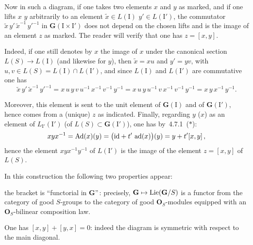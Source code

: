 Now in such a diagram, if one takes two elements \(x\) and \(y\) as marked, and if one
lifts \(x\) \resp \(y\) arbitrarily to an element \(\widetilde{x}\in L(\mathrm{I})\)
\resp \(y'\in L(\mathrm{I}')\), the commutator
\(\widetilde{x}\,y'\,\widetilde{x}^{-1}\,{y'}^{-1}\) in
\(\mathbf{G}(\mathrm{I}\times\mathrm{I}')\) does not depend on the chosen lifts and is
the image of an element \(z\) as marked. The reader will verify that one has
\(z=[x,y]\).%
{\renewcommand{\thefootnote}{(79)}}

Indeed, if one still denotes by \(x\) the image of \(x\) under the canonical section
\(L(S)\to L(\mathrm{I})\) (and likewise for \(y\)), then \(\widetilde{x}=xu\) and
\(y'=yv\), with \(u,v\in L(S)=L(\mathrm{I})\cap L(\mathrm{I}')\), and since
\(L(\mathrm{I})\) and \(L(\mathrm{I}')\) are commutative one has
\[
\widetilde{x}\,{y'}\,\widetilde{x}^{-1}\,{y'}^{-1}
  =x\,u\,y\,v\,u^{-1}\,x^{-1}\,v^{-1}\,y^{-1}
  =x\,u\,y\,u^{-1}\,v\,x^{-1}\,v^{-1}\,y^{-1}
  =x\,y\,x^{-1}\,y^{-1}.
\]

Moreover, this element is sent to the unit element of \(\mathbf{G}(\mathrm{I})\) and of
\(\mathbf{G}(\mathrm{I}')\), hence comes from a (unique) \(z\) as indicated. Finally,
regarding \(y\) (\resp \(x\)) as an element of \(L_{\mathrm{I}'}(\mathrm{I}')\)
(\resp of \(L(S)\subset\mathbf{G}(\mathrm{I}')\)), one has by~4.7.1~(\(*\)):
\[
xyx^{-1}=\operatorname{Ad}(x)(y)=\bigl(\mathrm{id}+t'\,\operatorname{ad}(x)\bigr)(y)=y+t'[x,y]\,,
\]
hence the element \(xyx^{-1}y^{-1}\) of \(L(\mathrm{I}')\) is the image of the element
\(z=[x,y]\) of \(L(S)\).

In this construction the following two properties appear:
\begin{enumeratei}
\item the bracket is ``functorial in \(\mathbf{G}\)''\,: precisely,
\(\mathbf{G}\mapsto\operatorname{Lie}(\mathbf{G}/S)\) is a functor from the category of good
\(S\)-groups to the category of good \(\mathbf{O}_{S}\)-modules equipped with an
\(\mathbf{O}_{S}\)-bilinear composition law.
\item One has \([x,y]+[y,x]=0\): indeed the diagram is symmetric with respect to the
main diagonal.%
{\renewcommand{\thefootnote}{(80)}}
\end{enumeratei}

